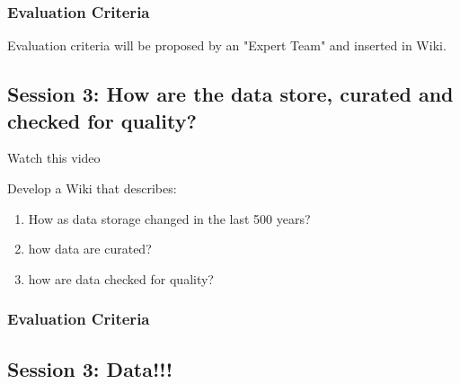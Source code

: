 \documentclass{article}\usepackage[]{graphicx}\usepackage[]{color}
\begin{document}
\subsubsection{Evaluation Criteria}

Evaluation criteria will be proposed by an "Expert Team" and inserted in Wiki. 

\subsection{Session 3: How are the data store, curated and checked for quality?}

Watch this video

Develop a Wiki that describes: 

\begin{enumerate}
  \item How as data storage changed in the last 500 years?
  \item how data are curated? 
  \item how are data checked for quality?
\end{enumerate}

\subsubsection{Evaluation Criteria}

\subsection{Session 3: Data!!!}
\end{document}
